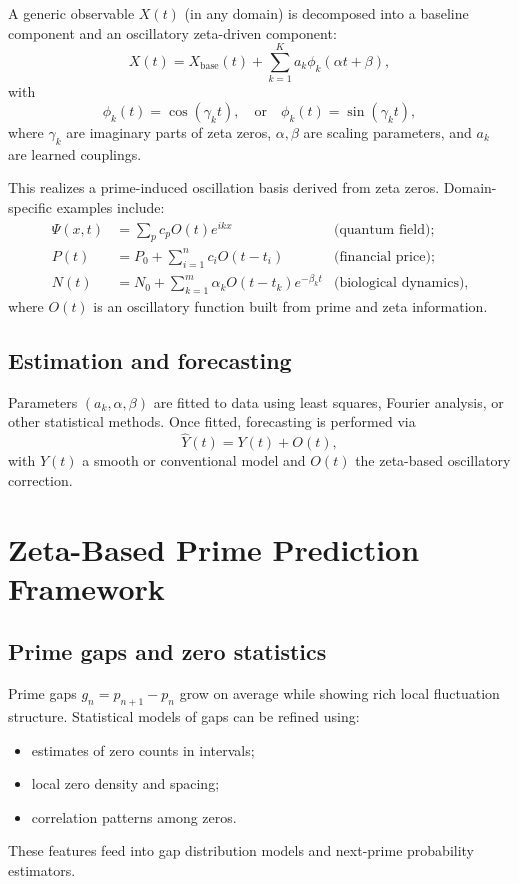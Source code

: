 \documentclass[11pt]{article}
\begin{document}
A generic observable $X(t)$ (in any domain) is decomposed into a baseline component and an oscillatory zeta-driven component:\cite{file1}
\[
X(t) = X_{\text{base}}(t) + \sum_{k=1}^{K} a_k \phi_k(\alpha t + \beta),
\]
with
\[
\phi_k(t) = \cos(\gamma_k t), \quad \text{or} \quad \phi_k(t) = \sin(\gamma_k t),
\]
where $\gamma_k$ are imaginary parts of zeta zeros, $\alpha,\beta$ are scaling parameters, and $a_k$ are learned couplings.\cite{file1,file2} 

This realizes a prime-induced oscillation basis derived from zeta zeros. Domain-specific examples include:\cite{file1}
\begin{align*}
\Psi(x,t) &= \sum_{p} c_p O(t) e^{ikx} & \text{(quantum field)}; \\
P(t) &= P_0 + \sum_{i=1}^{n} c_i O(t - t_i) & \text{(financial price)}; \\
N(t) &= N_0 + \sum_{k=1}^{m} \alpha_k O(t - t_k) e^{-\beta_k t} & \text{(biological dynamics)},
\end{align*}
where $O(t)$ is an oscillatory function built from prime and zeta information.\cite{file1}

\subsection{Estimation and forecasting}

Parameters $(a_k,\alpha,\beta)$ are fitted to data using least squares, Fourier analysis, or other statistical methods.\cite{file1} Once fitted, forecasting is performed via
\[
\hat{Y}(t) = Y(t) + O(t),
\]
with $Y(t)$ a smooth or conventional model and $O(t)$ the zeta-based oscillatory correction.\cite{file1}

\section{Zeta-Based Prime Prediction Framework}

\subsection{Prime gaps and zero statistics}

Prime gaps $g_n = p_{n+1} - p_n$ grow on average while showing rich local fluctuation structure.\cite{file2} Statistical models of gaps can be refined using:
\begin{itemize}[nosep]
    \item estimates of zero counts in intervals;
    \item local zero density and spacing;
    \item correlation patterns among zeros.
\end{itemize}
These features feed into gap distribution models and next-prime probability estimators.\cite{file2}
\end{document}
